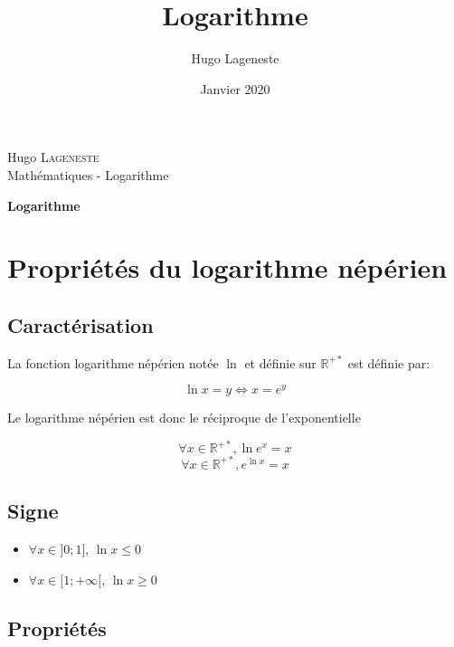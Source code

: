 \documentclass[a4paper]{article}
\title{Logarithme}
\author{Hugo Lageneste}
\date{Janvier 2020}
\begin{document}
{Hugo \textsc{Lageneste}}\\
{Mathématiques - Logarithme}

\begin{center}
 \newcommand{\HRule}{\rule{\linewidth}{0.5mm}}
 {\huge \bfseries Logarithme}\\[0.1cm]
\end{center}

\section{Propriétés du logarithme népérien}
\subsection{Caractérisation}

{La fonction logarithme népérien notée $\ln{}$ et définie sur $\mathbb{R}^{+*}$ est définie par:}

\[\ln{x}=y \Leftrightarrow x=e^y\]

{Le logarithme népérien est donc le réciproque de l'exponentielle}

\[\forall x \in \mathbb{R}^{+*}, \ln{e^x}=x\]
\[\forall x \in \mathbb{R}^{+*}, e^{\ln{x}}=x\]

\subsection{Signe}

\begin{multicols}{2}
	\begin{itemize}
  		\item{$\forall x \in ]0;1]$, $\ln{x} \leqslant 0$}
  		\item{$\forall x \in [1;+\infty[$, $\ln{x} \geqslant 0$}
	\end{itemize}
\end{multicols}

\begin{center}
\end{center}

\subsection{Propriétés}
\end{document}
